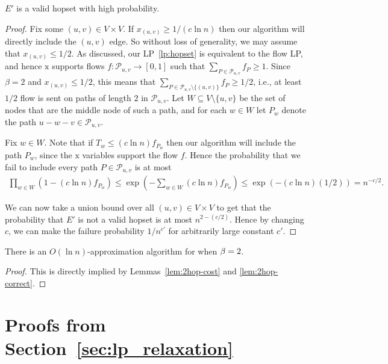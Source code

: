 \begin{lemma} \label{lem:2hop-correct}
$E'$ is a valid hopset with high probability.
\end{lemma}
\begin{proof}
    Fix some $(u,v) \in V \times V$.  If $x_{(u,v)} \geq 1/(c \ln n)$ then our algorithm will directly include the $(u,v)$ edge.  So without loss of generality, we may assume that $x_{(u,v)} \leq 1/2$.  As discussed, our LP~\eqref{lp:hopset} is equivalent to the flow LP, and hence $\bm{\mathrm{x}}$ supports flows $f : \mathcal P_{u,v} \rightarrow [0,1]$ such that $\sum_{P \in \mathcal P_{u,v}} f_P \geq 1$.  Since $\beta = 2$ and $x_{(u,v)} \leq 1/2$, this means that $\sum_{P \in \mathcal P_{u,v} \setminus \{(u,v)\}} f_P \geq 1/2$, i.e., at least $1/2$ flow is sent on paths of length $2$ in $\mathcal P_{u,v}$.  Let $W \subseteq V \setminus \{u,v\}$ be the set of nodes that are the middle node of such a path, and for each $w \in W$ let $P_w$ denote the path $u-w-v \in \mathcal P_{u,v}$.

    Fix $w \in W$.  Note that if $T_w \leq (c \ln n) f_{P_w}$ then our algorithm will include the path $P_w$, since the $\bm{\mathrm{x}}$ variables support the flow $f$.  Hence the probability that we fail to include every path $P \in \mathcal P_{u,v}$ is at most
    \begin{align*}
        \prod_{w \in W} (1-(c\ln n) f_{P_w}) \leq \exp\left(-\sum_{w \in W} (c \ln n) f_{P_w}\right) \leq \exp(-(c \ln n) (1/2)) = n^{-c/2}.
    \end{align*}
    
    We can now take a union bound over all $(u,v) \in V \times V$ to get that the probability that $E'$ is not a valid hopset is at most $n^{2-(c/2)}$.  Hence by changing $c$, we can make the failure probability $1/n^{c'}$ for arbitrarily large constant $c'$.  
\end{proof}

\begin{theorem} \label{thm:2hop-main}
    There is an $O(\ln n)$-approximation algorithm for {\hopset} when $\beta = 2$.
\end{theorem}
\begin{proof}
    This is directly implied by Lemmas~\ref{lem:2hop-cost} and \ref{lem:2hop-correct}.
\end{proof}



\section{Proofs from Section~\ref{sec:lp_relaxation}} \label{app:lp}

